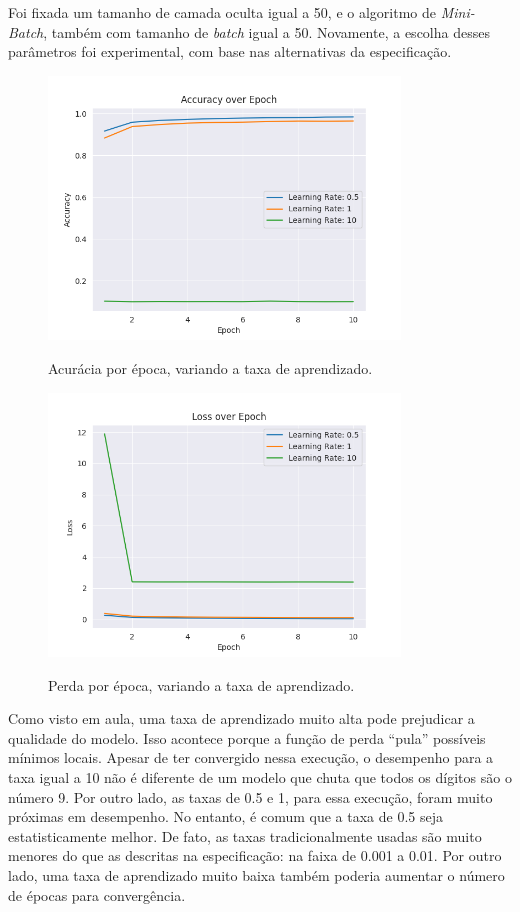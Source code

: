 \documentclass[a4paper]{article}
\begin{document}
Foi fixada um tamanho de camada oculta igual a 50, e o algoritmo de \textit{Mini-Batch}, também com tamanho de \textit{batch} igual a 50. Novamente, a escolha desses parâmetros foi experimental, com base nas alternativas da especificação.

\begin{figure}[H]
  \begin{center}
  {\includegraphics[height=7cm]{./images/Accuracy_over_Epoch_var_Rate.png}}
  \end{center}
  \caption{Acurácia por época, variando a taxa de aprendizado. \label{fig:aer}}
\end{figure}

\begin{figure}[H]
  \begin{center}
  {\includegraphics[height=7cm]{./images/Loss_over_Epoch_var_Rate.png}}
  \end{center}
  \caption{Perda por época, variando a taxa de aprendizado. \label{fig:ler}}
\end{figure}

Como visto em aula, uma taxa de aprendizado muito alta pode prejudicar a qualidade do modelo. Isso acontece porque a função de perda “pula” possíveis mínimos locais. Apesar de ter convergido nessa execução, o desempenho para a taxa igual a 10 não é diferente de um modelo que chuta que todos os dígitos são o número 9. Por outro lado, as taxas de 0.5 e 1, para essa execução, foram muito próximas em desempenho. No entanto, é comum que a taxa de 0.5 seja estatisticamente melhor. De fato, as taxas tradicionalmente usadas são muito menores do que as descritas na especificação: na faixa de 0.001 a 0.01. Por outro lado, uma taxa de aprendizado muito baixa também poderia aumentar o número de épocas para convergência.
\end{document}
